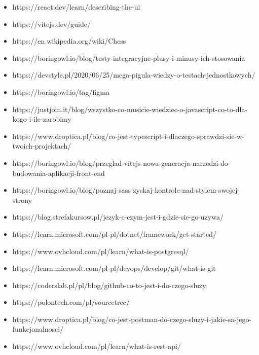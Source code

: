 \documentclass[12pt,a4paper]{article}
\begin{document}
\begin{itemize}
    \item https://react.dev/learn/describing-the-ui
    \item https://vitejs.dev/guide/
    \item https://en.wikipedia.org/wiki/Chess
    \item https://boringowl.io/blog/testy-integracyjne-plusy-i-minusy-ich-stosowania
    \item https://devstyle.pl/2020/06/25/mega-pigula-wiedzy-o-testach-jednostkowych/
    \item https://boringowl.io/tag/figma
    \item https://justjoin.it/blog/wszystko-co-musicie-wiedziec-o-javascript-co-to-dla-kogo-i-ile-zarobimy
    \item https://www.droptica.pl/blog/co-jest-typescript-i-dlaczego-sprawdzi-sie-w-twoich-projektach/
    \item https://boringowl.io/blog/przeglad-vitejs-nowa-generacja-narzedzi-do-budowania-aplikacji-front-end
    \item https://boringowl.io/blog/poznaj-sass-zyskaj-kontrole-nad-stylem-swojej-strony
    \item https://blog.strefakursow.pl/jezyk-c-czym-jest-i-gdzie-sie-go-uzywa/
    \item https://learn.microsoft.com/pl-pl/dotnet/framework/get-started/
    \item https://www.ovhcloud.com/pl/learn/what-is-postgresql/
    \item https://learn.microsoft.com/pl-pl/devops/develop/git/what-is-git
    \item https://coderslab.pl/pl/blog/github-co-to-jest-i-do-czego-sluzy
    \item https://polontech.com/pl/sourcetree/
    \item https://www.droptica.pl/blog/co-jest-postman-do-czego-sluzy-i-jakie-sa-jego-funkcjonalnosci/
    \item https://www.ovhcloud.com/pl/learn/what-is-rest-api/
\end{itemize}
\end{document}
